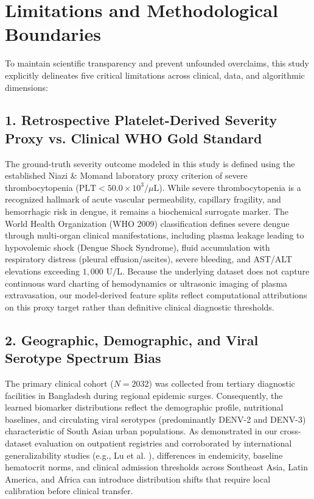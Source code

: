 \documentclass[12pt, a4paper]{report}
\begin{document}
\section{Limitations and Methodological Boundaries}
To maintain scientific transparency and prevent unfounded overclaims, this study explicitly delineates five critical limitations across clinical, data, and algorithmic dimensions:

\subsection{1. Retrospective Platelet-Derived Severity Proxy vs. Clinical WHO Gold Standard}
The ground-truth severity outcome modeled in this study is defined using the established Niazi \& Momand \cite{niazi2026} laboratory proxy criterion of severe thrombocytopenia ($\text{PLT} < 50.0 \times 10^3/\mu\text{L}$). While severe thrombocytopenia is a recognized hallmark of acute vascular permeability, capillary fragility, and hemorrhagic risk in dengue, it remains a biochemical surrogate marker. The World Health Organization (WHO 2009) classification defines severe dengue through multi-organ clinical manifestations, including plasma leakage leading to hypovolemic shock (Dengue Shock Syndrome), fluid accumulation with respiratory distress (pleural effusion/ascites), severe bleeding, and AST/ALT elevations exceeding $1,000\text{ U/L}$. Because the underlying dataset does not capture continuous ward charting of hemodynamics or ultrasonic imaging of plasma extravasation, our model-derived feature splits reflect computational attributions on this proxy target rather than definitive clinical diagnostic thresholds.

\subsection{2. Geographic, Demographic, and Viral Serotype Spectrum Bias}
The primary clinical cohort ($N = 2032$) was collected from tertiary diagnostic facilities in Bangladesh during regional epidemic surges. Consequently, the learned biomarker distributions reflect the demographic profile, nutritional baselines, and circulating viral serotypes (predominantly DENV-2 and DENV-3) characteristic of South Asian urban populations. As demonstrated in our cross-dataset evaluation on outpatient registries and corroborated by international generalizability studies (e.g., Lu et al. \cite{lu2025}), differences in endemicity, baseline hematocrit norms, and clinical admission thresholds across Southeast Asia, Latin America, and Africa can introduce distribution shifts that require local calibration before clinical transfer.
\end{document}
